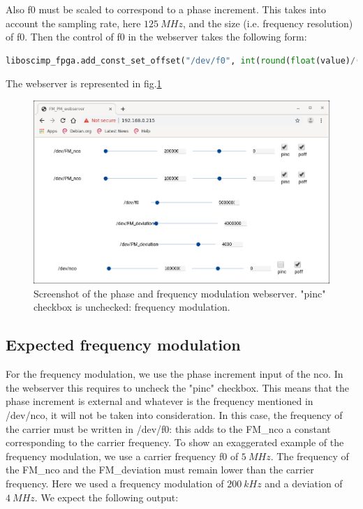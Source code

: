 \documentclass[12pt,oneside]{article}
\begin{document}
Also f0 must be scaled to correspond to a phase increment. This takes into account the sampling rate, here $125~MHz$, and the size (i.e. frequency resolution) of f0. Then the control of f0 in the webserver takes the following form:

\vspace{-0.1cm}
\begin{lstlisting}[language=Python]
liboscimp_fpga.add_const_set_offset("/dev/f0", int(round(float(value)/(125e6/2**40))))
\end{lstlisting}
\vspace{+0.5cm}

The webserver is represented in fig.\ref{fig:FMPMwebserver}

\begin{figure}[h!tb]
	\begin{center}
		\vspace{0.5cm}
		\includegraphics[width=14cm,trim={0cm 0cm 0cm 0cm}, clip]{webserver/2020-01-07-090526_907x561_scrot.png}
		\caption{Screenshot of the phase and frequency modulation webserver. "pinc" checkbox is unchecked: frequency modulation.}
		\label{fig:FMPMwebserver}
	\end{center}
\end{figure}
\vspace{+0cm}

\subsection{Expected frequency modulation}
\vspace{+0.0cm}

For the frequency modulation, we use the phase increment input of the nco. In the webserver this requires to uncheck the "pinc" checkbox. This means that the phase increment is external and whatever is the frequency mentioned in /dev/nco, it will not be taken into consideration. In this case, the frequency of the carrier must be written in /dev/f0: this adds to the FM\_nco a constant corresponding to the carrier frequency. 
\newline
To show an exaggerated example of the frequency modulation, we use a carrier frequency f0 of $5~MHz$. The frequency of the FM\_nco and the FM\_deviation must remain lower than the carrier frequency. Here we used a frequency modulation of $200~kHz$ and a deviation of $4~MHz$. We expect the following output: 
\end{document}
